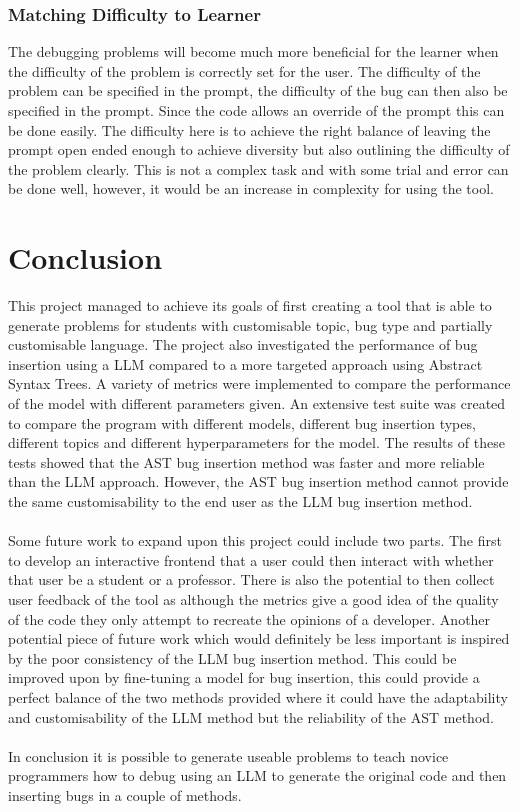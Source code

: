 \documentclass[12pt]{extarticle}
\begin{document}
\subsubsection{Matching Difficulty to Learner}

The debugging problems will become much more beneficial for the learner when the difficulty of the problem is correctly set for the user. The difficulty of the problem can be specified in the prompt, the difficulty of the bug can then also be specified in the prompt. Since the code allows an override of the prompt this can be done easily. The difficulty here is to achieve the right balance of leaving the prompt open ended enough to achieve diversity but also outlining the difficulty of the problem clearly. This is not a complex task and with some trial and error can be done well, however, it would be an increase in complexity for using the tool.


\newpage
\section{Conclusion}

This project managed to achieve its goals of first creating a tool that is able to generate problems for students with customisable topic, bug type and partially customisable language. The project also investigated the performance of bug insertion using a LLM compared to a more targeted approach using Abstract Syntax Trees. A variety of metrics were implemented to compare the performance of the model with different parameters given. An extensive test suite was created to compare the program with different models, different bug insertion types, different topics and different hyperparameters for the model. The results of these tests showed that the AST bug insertion method was faster and more reliable than the LLM approach. However, the AST bug insertion method cannot provide the same customisability to the end user as the LLM bug insertion method.\\
\\
Some future work to expand upon this project could include two parts. The first to develop an interactive frontend that a user could then interact with whether that user be a student or a professor. There is also the potential to then collect user feedback of the tool as although the metrics give a good idea of the quality of the code they only attempt to recreate the opinions of a developer. Another potential piece of future work which would definitely be less important is inspired by the poor consistency of the LLM bug insertion method. This could be improved upon by fine-tuning a model for bug insertion, this could provide a perfect balance of the two methods provided where it could have the adaptability and customisability of the LLM method but the reliability of the AST method.\\
\\
In conclusion it is possible to generate useable problems to teach novice programmers how to debug using an LLM to generate the original code and then inserting bugs in a couple of methods.
\end{document}
